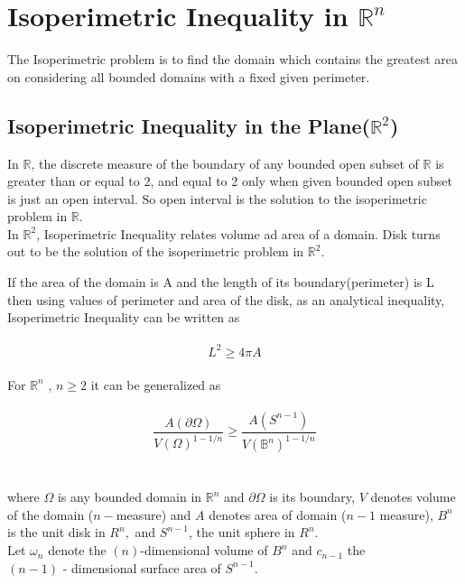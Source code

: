 \documentclass[oneside]{book}
\begin{document}
	
	
	
	
	
	
	
	
	
	
	
	
	
	
	
	
	
	
	
	
	\chapter{Isoperimetric Inequality in $\mathbb{R}^{n}$} 
	\label{chap:c3}
	The Isoperimetric problem is to find the domain which contains the greatest area on considering all bounded domains with a fixed given perimeter.
	
	
	
	
	
	\section{\textbf{Isoperimetric Inequality in the Plane($\mathbb{R}^{2}$)}}
	\label{s:2}
	In $\mathbb{R}$, the discrete measure of the boundary of any bounded open subset of $\mathbb{R}$ is greater than or equal to 2, and equal to 2 only when given bounded open subset is just an open interval. So open interval is the solution to the isoperimetric problem in $\mathbb{R}$.\\
	In $\mathbb{R}^{2}$, Isoperimetric Inequality relates volume ad area of a domain. Disk turns out to be the solution of the isoperimetric problem in $\mathbb{R}^{2}.$   
	
	If the area of the domain is A and the length of its boundary(perimeter) is L then using values of perimeter and area of the disk,
	as an analytical inequality, Isoperimetric Inequality can be written as \\\\
	\begin{equation}
		\label{eq5}  
		L^{2} \geq 4 \pi A
	\end{equation}
	\\
	For $\mathbb{R}^{n}$ 
	, $n \geq 2$  it can be generalized as
	\\\\
	\begin{equation}
		\label{eq6}  
		\frac{A(\partial \Omega)}{V(\Omega)^{1-1 / n}} \geq \frac{A\left(S^{n-1}\right)}{V\left(\mathbb{B}^{n}\right)^{1-1 / n}}
	\end{equation} \\\\
	where $\Omega$ is any bounded domain in $\mathbb{R}^{n}$ and $\partial \Omega$ is its boundary, $V$ denotes volume of the domain ($n-$measure) and $A$ denotes area of domain ($n-1$ measure), $B^{n}$ is the unit disk in $R^{n},$ and $S^{n-1}$,
	the unit sphere in $R^{n}$.
	\\
	Let $\omega_{n}$ denote the $(n)$-dimensional volume of $B^{n}$ and  $c_{n-1}$ the \\ $(n-1)$ -
	dimensional surface area of $S^{n-1}$. \\
	
\end{document}
